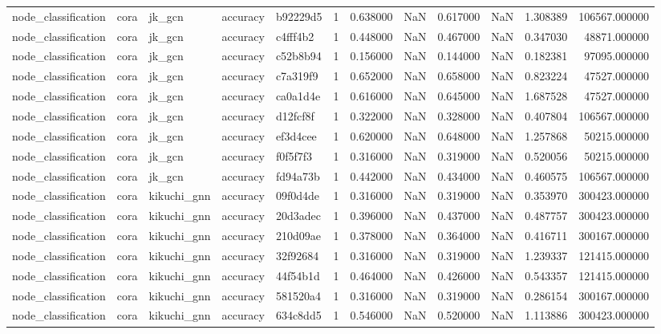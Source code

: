 \begin{tabular}{lllllrrrrrrr}
node_classification & cora & jk_gcn & accuracy & b92229d5 & 1 & 0.638000 & NaN & 0.617000 & NaN & 1.308389 & 106567.000000 \\
node_classification & cora & jk_gcn & accuracy & c4fff4b2 & 1 & 0.448000 & NaN & 0.467000 & NaN & 0.347030 & 48871.000000 \\
node_classification & cora & jk_gcn & accuracy & c52b8b94 & 1 & 0.156000 & NaN & 0.144000 & NaN & 0.182381 & 97095.000000 \\
node_classification & cora & jk_gcn & accuracy & c7a319f9 & 1 & 0.652000 & NaN & 0.658000 & NaN & 0.823224 & 47527.000000 \\
node_classification & cora & jk_gcn & accuracy & ca0a1d4e & 1 & 0.616000 & NaN & 0.645000 & NaN & 1.687528 & 47527.000000 \\
node_classification & cora & jk_gcn & accuracy & d12fcf8f & 1 & 0.322000 & NaN & 0.328000 & NaN & 0.407804 & 106567.000000 \\
node_classification & cora & jk_gcn & accuracy & ef3d4cee & 1 & 0.620000 & NaN & 0.648000 & NaN & 1.257868 & 50215.000000 \\
node_classification & cora & jk_gcn & accuracy & f0f5f7f3 & 1 & 0.316000 & NaN & 0.319000 & NaN & 0.520056 & 50215.000000 \\
node_classification & cora & jk_gcn & accuracy & fd94a73b & 1 & 0.442000 & NaN & 0.434000 & NaN & 0.460575 & 106567.000000 \\
node_classification & cora & kikuchi_gnn & accuracy & 09f0d4de & 1 & 0.316000 & NaN & 0.319000 & NaN & 0.353970 & 300423.000000 \\
node_classification & cora & kikuchi_gnn & accuracy & 20d3adec & 1 & 0.396000 & NaN & 0.437000 & NaN & 0.487757 & 300423.000000 \\
node_classification & cora & kikuchi_gnn & accuracy & 210d09ae & 1 & 0.378000 & NaN & 0.364000 & NaN & 0.416711 & 300167.000000 \\
node_classification & cora & kikuchi_gnn & accuracy & 32f92684 & 1 & 0.316000 & NaN & 0.319000 & NaN & 1.239337 & 121415.000000 \\
node_classification & cora & kikuchi_gnn & accuracy & 44f54b1d & 1 & 0.464000 & NaN & 0.426000 & NaN & 0.543357 & 121415.000000 \\
node_classification & cora & kikuchi_gnn & accuracy & 581520a4 & 1 & 0.316000 & NaN & 0.319000 & NaN & 0.286154 & 300167.000000 \\
node_classification & cora & kikuchi_gnn & accuracy & 634c8dd5 & 1 & 0.546000 & NaN & 0.520000 & NaN & 1.113886 & 300423.000000 \\

\end{tabular}
